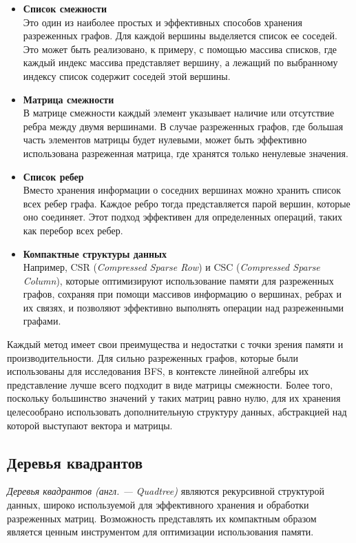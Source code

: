 \begin{itemize}
	\item{\textbf{Список смежности}} \\
	      Это один из наиболее простых и эффективных способов хранения разреженных графов. Для каждой вершины выделяется список ее соседей. Это может быть реализовано, к примеру, с помощью массива списков, где каждый индекс массива представляет вершину, а лежащий по выбранному индексу список содержит соседей этой вершины.
	\item{\textbf{Матрица смежности}} \\
	      В матрице смежности каждый элемент указывает наличие или отсутствие ребра между двумя вершинами. В случае разреженных графов, где большая часть элементов матрицы будет нулевыми, может быть эффективно использована разреженная матрица, где хранятся только ненулевые значения.
	\item{\textbf{Список ребер}} \\
	      Вместо хранения информации о соседних вершинах можно хранить список всех ребер графа. Каждое ребро тогда представляется парой вершин, которые оно соединяет. Этот подход эффективен для определенных операций, таких как перебор всех ребер.
	\item{\textbf{Компактные структуры данных}} \\
	      Например, CSR (\textit{Compressed Sparse Row}) и CSC (\textit{Compressed Sparse Column}), которые оптимизируют использование памяти для разреженных графов, сохраняя при помощи массивов информацию о вершинах, ребрах и их связях, и позволяют эффективно выполнять операции над разреженными графами.
\end{itemize}

\noindent Каждый метод имеет свои преимущества и недостатки с точки зрения памяти и производительности. Для сильно разреженных графов, которые были использованы для исследования BFS, в контексте линейной алгебры их представление лучше всего подходит в виде матрицы смежности. Более того, поскольку большинство значений у таких матриц равно нулю, для их хранения целесообрано использовать дополнительную структуру данных, абстракцией над которой выступают вектора и матрицы.

\subsection{Деревья квадрантов}
\noindent \textit{Деревья квадрантов (англ. --- Quadtree)} являются рекурсивной структурой данных, широко используемой для эффективного хранения и обработки разреженных матриц. Возможность представлять их компактным образом является ценным инструментом для оптимизации использования памяти.

